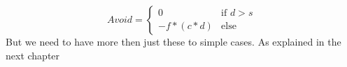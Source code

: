 		\begin{displaymath}
			Avoid = \begin{cases}
					0 & \text{if $d > s$}\\
					-f * (c * d) & \text{else}
				\end{cases}		
		\end{displaymath}
		But we need to have more then just these to simple cases. As explained in the next chapter
		
		